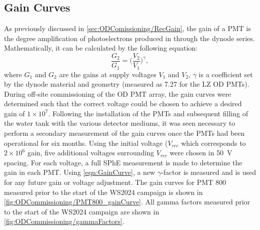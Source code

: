\subsection{Gain Curves}
As previously discussed in \autoref{sec:ODComissioning/RecGain}, the gain of a PMT is the degree amplification of photoelectrons produced in through the dynode series. Mathematically, it can be calculated by the following equation:
\begin{equation}
    \label{eqn:GainCurve}
    \frac{G_2}{G_1}=\biggl(\frac{V_2}{V_1}\biggl)^\gamma,
\end{equation}
where $G_1$ and $G_2$ are the gains at supply voltages $V_1$ and $V_2$, $\gamma$ is a coefficient set by the dynode material and geometry (measured as 7.27 for the LZ OD PMTs). During off-site commissioning of the OD PMT array, the gain curves were determined such that the correct voltage could be chosen to achieve a desired gain of $1\times10^7$. Following the installation of the PMTs and subsequent filling of the water tank with the various detector mediums, it was seen necessary to perform a secondary measurement of the gain curves once the PMTs had been operational for six months.
Using the initial voltage ($V_{rec}$ which corresponds to $2\times10^6$ gain, five additional voltages surrounding $V_{rec}$ were chosen in 50~V spacing. For each voltage, a full SPhE measurement is made to determine the gain in each PMT. Using \autoref{eqn:GainCurve}, a new $\gamma$-factor is measured and is used for any future gain or voltage adjustment. The gain curves for PMT 800 measured prior to the start of the WS2024 campaign is shown in \autoref{fig:ODCommissioning/PMT800_gainCurve}. All gamma factors measured prior to the start of the WS2024 campaign are shown in \autoref{fig:ODCommissioning/gammaFactors}.
\iffalse
